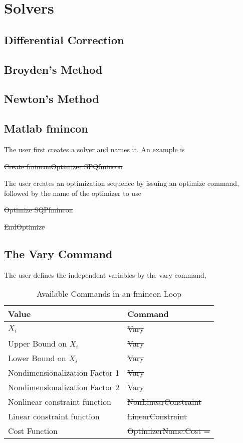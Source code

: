 \chapter{Solvers}  \label{Ch:Solvers}

\section{Differential Correction}

\section{Broyden's Method}

\section{Newton's Method}

\section{Matlab fmincon}

The user first creates a solver and names it.  An example is

 \st{ Create fminconOptimizer SPQfmincon}

 The user creates an optimization sequence by issuing an optimize
 command, followed by the name of the optimizer to use

 \st{Optimize SQPfmincon}

 \st{EndOptimize}

 \section{The Vary Command}
The user defines the independent variables by the vary command,

\begin{table}[htb]
\caption{ Available Commands in an fmincon Loop }
\begin{tabular}{p{1.5 in} p{1.5 in}}
   \hline
   Value & Command\\
   \hline \hline
     $X_i$ & \st{Vary} \\
    Upper Bound on $X_i$ & \st{Vary}  \\
   Lower Bound on $X_i$ & \st{Vary} \\
   Nondimensionalization Factor 1 & \st{Vary} \\
   Nondimensionalization Factor 2 & \st{Vary} \\
   Nonlinear constraint function& \st{NonLinearConstraint} \\
   Linear constraint function & \st{LinearConstraint} \\
   Cost Function & \st{OptimizerName.Cost = }\\
   \hline
 \end{tabular}
 \label{Table:EventFunction_dValues}
\end{table}
